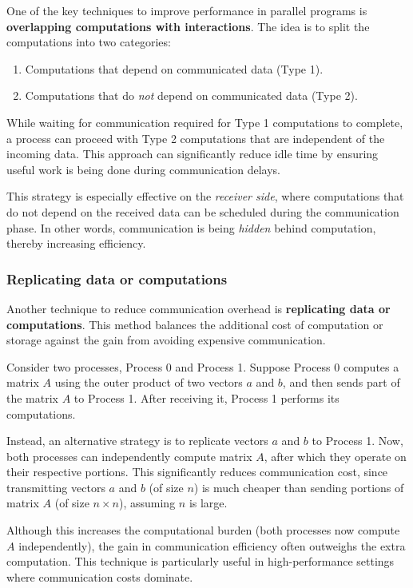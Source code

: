 \documentclass[12pt]{book}
\begin{document}
One of the key techniques to improve performance in parallel programs is \textbf{overlapping computations with interactions}. The idea is to split the computations into two categories: 
\begin{enumerate}
    \item Computations that depend on communicated data (Type 1).
    \item Computations that do \emph{not} depend on communicated data (Type 2).
\end{enumerate}

While waiting for communication required for Type 1 computations to complete, a process can proceed with Type 2 computations that are independent of the incoming data. This approach can significantly reduce idle time by ensuring useful work is being done during communication delays.

This strategy is especially effective on the \textit{receiver side}, where computations that do not depend on the received data can be scheduled during the communication phase. In other words, communication is being \textit{hidden} behind computation, thereby increasing efficiency.

\subsubsection{Replicating data or computations}

Another technique to reduce communication overhead is \textbf{replicating data or computations}. This method balances the additional cost of computation or storage against the gain from avoiding expensive communication.

Consider two processes, Process 0 and Process 1. Suppose Process 0 computes a matrix $A$ using the outer product of two vectors $a$ and $b$, and then sends part of the matrix $A$ to Process 1. After receiving it, Process 1 performs its computations.

Instead, an alternative strategy is to replicate vectors $a$ and $b$ to Process 1. Now, both processes can independently compute matrix $A$, after which they operate on their respective portions. This significantly reduces communication cost, since transmitting vectors $a$ and $b$ (of size $n$) is much cheaper than sending portions of matrix $A$ (of size $n \times n$), assuming $n$ is large.

Although this increases the computational burden (both processes now compute $A$ independently), the gain in communication efficiency often outweighs the extra computation. This technique is particularly useful in high-performance settings where communication costs dominate.
\end{document}
